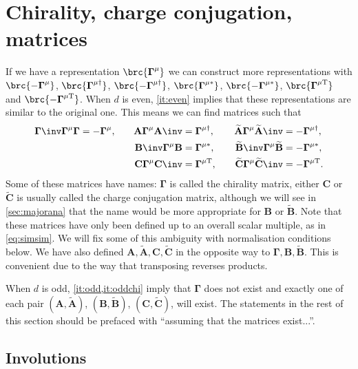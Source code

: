 \documentclass[11pt]{article}
\newcommand{\Gammab}{\boldsymbol{\Gamma}}
\newcommand{\mud}{^{\mu\dag}}
\newcommand{\mut}{^{\mu\mathrm{T}}}
\newcommand{\muc}{^{\mu\ast}}
\newcommand{\A}{\mathbf{A}}
\newcommand{\B}{\mathbf{B}}
\renewcommand{\C}{\mathbf{C}}
\newcommand{\At}{\widetilde{\A}}
\newcommand{\Bt}{\widetilde{\B}}
\newcommand{\Ct}{\widetilde{\C}}
\begin{document}

\section{Chirality, charge conjugation, \etc matrices}\label{sec:ccmats}


If we have a representation \(\brc{\Gammab^\mu}\) we can construct more representations with \(\brc{-\Gammab^\mu}\), \(\brc{\Gammab\mud}\), \(\brc{-\Gammab\mud}\), \(\brc{\Gammab\muc}\), \(\brc{-\Gammab\muc}\), \(\brc{\Gammab\mut}\) and \(\brc{-\Gammab\mut}\).
When \(d\) is even, \cref{it:even} implies that these representations are similar to the original one.
This means we can find matrices such that
%
\begin{equation}\label{eq:cccmats}
\begin{aligned}
  \Gammab\inv \Gammab^\mu \Gammab &= -\Gammab^\mu, &\quad
  \A  \Gammab^\mu \A\inv  &=  \Gammab\mud, &\quad
  \At \Gammab^\mu \At\inv &= -\Gammab\mud, \\ &&
  \B\inv  \Gammab^\mu \B  &=  \Gammab\muc, &
  \Bt\inv \Gammab^\mu \Bt &= -\Gammab\muc, \\ &&
  \C  \Gammab^\mu \C\inv  &=  \Gammab\mut, &
  \Ct \Gammab^\mu \Ct\inv &= -\Gammab\mut.
\end{aligned}
\end{equation}
%
Some of these matrices have names: \(\Gammab\) is called the chirality matrix, either \(\C\) or \(\Ct\) is usually called the charge conjugation matrix, although we will see in \cref{sec:majorana} that the name would be more appropriate for \(\B\) or \(\Bt\).
Note that these matrices have only been defined up to an overall scalar multiple, as in \cref{eq:simsim}.
We will fix some of this ambiguity with normalisation conditions below.
We have also defined \(\A,\At,\C,\Ct\) in the opposite way to \(\Gammab,\B,\Bt\).
This is convenient due to the way that transposing reverses products.

When \(d\) is odd, \cref{it:odd,it:oddchi} imply that \(\Gammab\) does not exist and exactly one of each pair \((\A, \At)\), \((\B, \Bt)\), \((\C, \Ct)\), will exist.
The statements in the rest of this section should be prefaced with ``assuming that the matrices exist...''.


\subsection{Involutions}\label{sec:invol}
\end{document}
